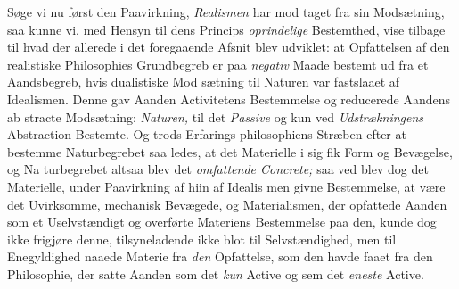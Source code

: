 Søge vi nu først den Paavirkning, \emph{Realismen} har mod\-%
taget fra sin Modsætning, saa kunne vi, med Hensyn til dens
Princips \emph{oprindelige} Bestemthed, vise tilbage til hvad der
allerede i det foregaaende Afsnit blev udviklet: at Opfattelsen
af den realistiske Philosophies Grundbegreb er paa \emph{negativ}
Maade bestemt ud fra et Aandsbegreb, hvis dualistiske Mod\-%
sætning til Naturen var fastslaaet af Idealismen. Denne gav
Aanden Activitetens Bestemmelse og reducerede Aandens ab\-%
stracte Modsætning: \emph{Naturen,} til det \emph{Passive} og kun ved
\emph{Udstrækningens} Abstraction Bestemte. Og trods Erfarings\-%
philosophiens Stræben efter at bestemme Naturbegrebet saa\-%
ledes, at det Materielle i sig fik Form og Bevægelse, og Na\-%
turbegrebet altsaa blev det \emph{omfattende Concrete;} saa ved\-%
blev dog det Materielle, under Paavirkning af hiin af Idealis\-%
men givne Bestemmelse, at være det Uvirksomme, mechanisk
Bevægede, og Materialismen, der opfattede Aanden som et
Uselvstændigt og overførte Materiens Bestemmelse paa den,
kunde dog ikke frigjøre denne, tilsyneladende ikke blot til
Selvstændighed, men til Enegyldighed naaede Materie fra \emph{den}
Opfattelse, som den havde faaet fra den Philosophie, der satte
Aanden som det \emph{kun} Active og sem det \emph{eneste} Active.

